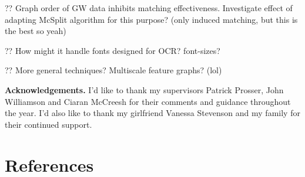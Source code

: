 \documentclass{mpaper}
\begin{document}
?? Graph order of GW data inhibits matching effectiveness. Investigate effect of adapting McSplit algorithm for this purpose? (only induced matching, but this is the best so yeah)

?? How might it handle fonts designed for OCR? font-sizes?

?? More general techniques? Multiscale feature graphs? (lol)

\noindent
{\bf Acknowledgements.}
I'd like to thank my supervisors Patrick Prosser, John Williamson and Ciaran McCreesh for their comments and guidance throughout the year.
I'd also like to thank my girlfriend Vanessa Stevenson and my family for their continued support.

\section{References}
\renewcommand*{\bibfont}{\footnotesize}
\printbibliography[heading=none]

\vspace{1em}
\end{document}
